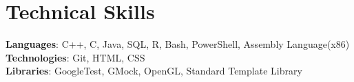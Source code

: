 \documentclass[letterpaper,11pt]{article}
\begin{document}

\section{Technical Skills}
 \begin{itemize}[leftmargin=0.15in, label={}]
    \small{\item{
     \textbf{Languages}{: C++, C, Java, SQL, R, Bash, PowerShell, Assembly Language(x86)} \\
     \textbf{Technologies}{: Git, HTML, CSS } \\
     \textbf{Libraries}{: GoogleTest, GMock, OpenGL, Standard Template Library}
    }}
 \end{itemize}
\end{document}
